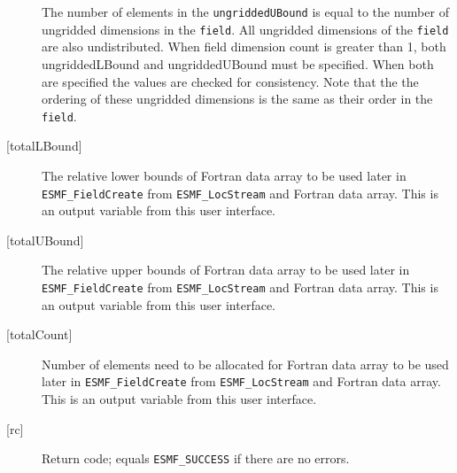 \begin{description}
         The number of elements in the {\tt ungriddedUBound} is equal to the number of ungridded
         dimensions in the {\tt field}.  All ungridded dimensions of the
         {\tt field} are also undistributed. When field dimension count is
         greater than 1, both ungriddedLBound and ungriddedUBound
         must be specified. When both are specified the values are checked
         for consistency.  Note that the the ordering of
         these ungridded dimensions is the same as their order in the {\tt field}.
   \item [{[totalLBound]}]
         \begin{sloppypar}
         The relative lower bounds of Fortran data array to be used
         later in {\tt ESMF\_FieldCreate} from {\tt ESMF\_LocStream} and Fortran data array.
         This is an output variable from this user interface.
         \end{sloppypar}
   \item [{[totalUBound]}]
         \begin{sloppypar}
         The relative upper bounds of Fortran data array to be used
         later in {\tt ESMF\_FieldCreate} from {\tt ESMF\_LocStream} and Fortran data array.
         This is an output variable from this user interface.
         \end{sloppypar}
   \item [{[totalCount]}]
         Number of elements need to be allocated for Fortran data array to be used
         later in {\tt ESMF\_FieldCreate} from {\tt ESMF\_LocStream} and Fortran data array.
         This is an output variable from this user interface.
  
   \item[{[rc]}]
       Return code; equals {\tt ESMF\_SUCCESS} if there are no errors.
   \end{description}
\setlength{\parskip}{\oldparskip}
\setlength{\parindent}{\oldparindent}
\setlength{\baselineskip}{\oldbaselineskip}
